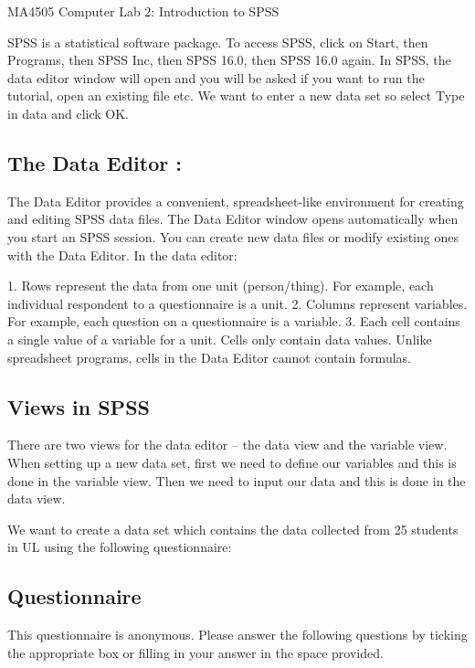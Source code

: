 MA4505     Computer Lab 2:   Introduction to SPSS
 
 
SPSS is a statistical software package. To access SPSS, click on Start, then Programs, then SPSS Inc, then SPSS 16.0, then SPSS 16.0 again. In SPSS, the data editor window will open and you will be asked if you want to run the tutorial, open an existing file etc. We want to enter a new data set so select Type in data and click OK.
 
 
\subsection{The Data Editor :}
The Data Editor provides a convenient, spreadsheet-like environment for creating and editing SPSS data files. The Data Editor window opens automatically when you start an SPSS session. You can create new data files or modify existing ones with the Data Editor. In the data editor:
 
1.      Rows represent the data from one unit (person/thing). For example, each individual respondent to a questionnaire is a unit.
2.      Columns represent variables. For example, each question on a questionnaire is a variable.
3.      Each cell contains a single value of a variable for a unit. Cells only contain data values. Unlike spreadsheet programs, cells in the Data Editor cannot contain formulas.
 

\subsection{Views in SPSS} 
There are two views for the data editor – the data view and the variable view. When setting up a new data set, first we need to define our variables and this is done in the variable view. Then we need to input our data and this is done in the data view.
 
We want to create a data set which contains the data collected from 25 students in UL using the following questionnaire:
 
 
 
 
 
 
 
 
 
\subsection*{Questionnaire}
 
This questionnaire is anonymous. Please answer the following questions by ticking the appropriate box or filling in your answer in the space provided.
 
